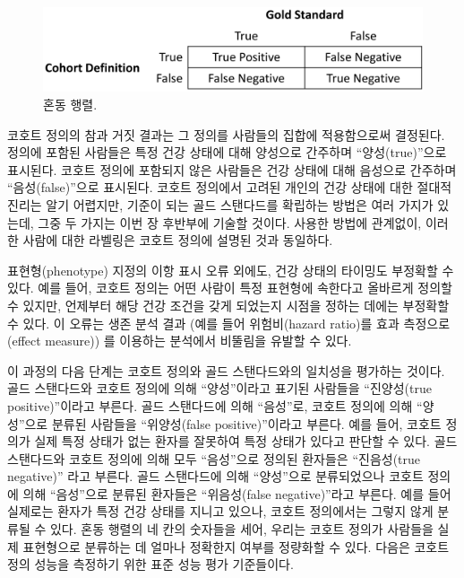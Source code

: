 \documentclass[11pt]{book}
\theoremstyle{definition}
\theoremstyle{definition}
\theoremstyle{definition}
\theoremstyle{remark}
\begin{document}
\begin{figure}

{\centering \includegraphics[width=0.75\linewidth]{images/ClinicalValidity/matrix} 

}

\caption{혼동 행렬.}\label{fig:matrix}
\end{figure}

코호트 정의의 참과 거짓 결과는 그 정의를 사람들의 집합에 적용함으로써
결정된다. 정의에 포함된 사람들은 특정 건강 상태에 대해 양성으로 간주하며
``양성(true)''으로 표시된다. 코호트 정의에 포함되지 않은 사람들은 건강
상태에 대해 음성으로 간주하며 ``음성(false)''으로 표시된다. 코호트
정의에서 고려된 개인의 건강 상태에 대한 절대적 진리는 알기 어렵지만,
기준이 되는 골드 스탠다드를 확립하는 방법은 여러 가지가 있는데, 그중 두
가지는 이번 장 후반부에 기술할 것이다. 사용한 방법에 관계없이, 이러한
사람에 대한 라벨링은 코호트 정의에 설명된 것과 동일하다.

표현형(phenotype) 지정의 이항 표시 오류 외에도, 건강 상태의 타이밍도
부정확할 수 있다. 예를 들어, 코호트 정의는 어떤 사람이 특정 표현형에
속한다고 올바르게 정의할 수 있지만, 언제부터 해당 건강 조건을 갖게
되었는지 시점을 정하는 데에는 부정확할 수 있다. 이 오류는 생존 분석 결과
(예를 들어 위험비(hazard ratio)를 효과 측정으로(effect measure)) 를
이용하는 분석에서 비뚤림을 유발할 수 있다.

이 과정의 다음 단계는 코호트 정의와 골드 스탠다드와의 일치성을 평가하는
것이다. 골드 스탠다드와 코호트 정의에 의해 ``양성''이라고 표기된
사람들을 ``진양성(true positive)''이라고 부른다. 골드 스탠다드에 의해
``음성''로, 코호트 정의에 의해 ``양성''으로 분류된 사람들을
``위양성(false positive)''이라고 부른다. 예를 들어, 코호트 정의가 실제
특정 상태가 없는 환자를 잘못하여 특정 상태가 있다고 판단할 수 있다. 골드
스탠다드와 코호트 정의에 의해 모두 ``음성''으로 정의된 환자들은
``진음성(true negative)'' 라고 부른다. 골드 스탠다드에 의해 ``양성''으로
분류되었으나 코호트 정의에 의해 ``음성''으로 분류된 환자들은
``위음성(false negative)''라고 부른다. 예를 들어 실제로는 환자가 특정
건강 상태를 지니고 있으나, 코호트 정의에서는 그렇지 않게 분류될 수 있다.
혼동 행렬의 네 칸의 숫자들을 세어, 우리는 코호트 정의가 사람들을 실제
표현형으로 분류하는 데 얼마나 정확한지 여부를 정량화할 수 있다. 다음은
코호트 정의 성능을 측정하기 위한 표준 성능 평가 기준들이다.
\end{document}
